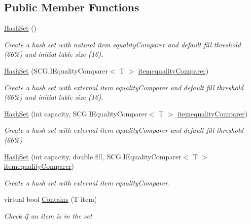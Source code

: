 \subsection*{Public Member Functions}
\begin{DoxyCompactItemize}
\item 
\hyperlink{class_c5_1_1_hash_set_a8c3fb4f50d669c1fe32977c8d3ef4963}{Hash\+Set} ()
\begin{DoxyCompactList}\small\item\em Create a hash set with natural item equality\+Comparer and default fill threshold (66\%) and initial table size (16). \end{DoxyCompactList}\item 
\hyperlink{class_c5_1_1_hash_set_a48ce3a77574ed39466a0a93c0543e033}{Hash\+Set} (S\+C\+G.\+I\+Equality\+Comparer$<$ T $>$ \hyperlink{class_c5_1_1_collection_base_a95e343400be0e8f3f8d6310f1aaf2cc6}{itemequality\+Comparer})
\begin{DoxyCompactList}\small\item\em Create a hash set with external item equality\+Comparer and default fill threshold (66\%) and initial table size (16). \end{DoxyCompactList}\item 
\hyperlink{class_c5_1_1_hash_set_a68917f421f09006c60050f7be04c8550}{Hash\+Set} (int capacity, S\+C\+G.\+I\+Equality\+Comparer$<$ T $>$ \hyperlink{class_c5_1_1_collection_base_a95e343400be0e8f3f8d6310f1aaf2cc6}{itemequality\+Comparer})
\begin{DoxyCompactList}\small\item\em Create a hash set with external item equality\+Comparer and default fill threshold (66\%) \end{DoxyCompactList}\item 
\hyperlink{class_c5_1_1_hash_set_acd7cc0d3e33d99fc320b9f8207650e5b}{Hash\+Set} (int capacity, double fill, S\+C\+G.\+I\+Equality\+Comparer$<$ T $>$ \hyperlink{class_c5_1_1_collection_base_a95e343400be0e8f3f8d6310f1aaf2cc6}{itemequality\+Comparer})
\begin{DoxyCompactList}\small\item\em Create a hash set with external item equality\+Comparer. \end{DoxyCompactList}\item 
virtual bool \hyperlink{class_c5_1_1_hash_set_af664a08eff9d9941c43e043bf5b367c3}{Contains} (T item)
\begin{DoxyCompactList}\small\item\em Check if an item is in the set \end{DoxyCompactList}\item 

\end{DoxyCompactItemize}
